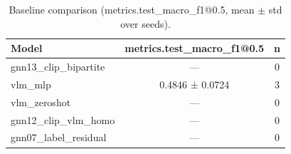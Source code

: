 \begin{table}[t]
\centering
\caption{Baseline comparison (metrics.test_macro_f1@0.5, mean $\pm$ std over seeds).}
\begin{tabular}{lcc}
\toprule
Model & metrics.test_macro_f1@0.5 & n \\
\midrule
gnn13_clip_bipartite & — & 0 \\
vlm_mlp & 0.4846 ± 0.0724 & 3 \\
vlm_zeroshot & — & 0 \\
gnn12_clip_vlm_homo & — & 0 \\
gnn07_label_residual & — & 0 \\
\bottomrule
\end{tabular}
\end{table}

